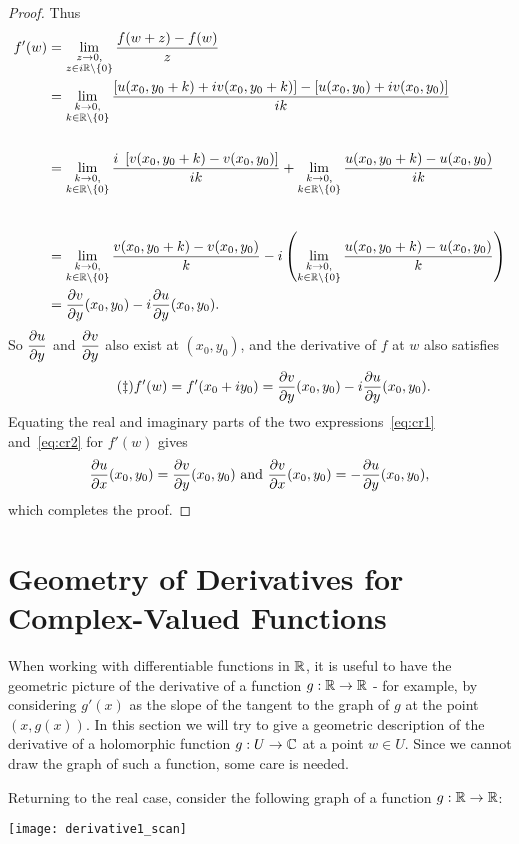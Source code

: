 \begin{proof}
Thus
\begin{align*}
f'(w) & = \rlim{z \to 0}{z \in i\R \backslash \set{0}} \frac{f(w+z)-f(w)}{z} \\
& = \rlim{k \to 0}{k \in \R \backslash \set{0}} \frac{\left[ u(x_0,y_0+k)+iv(x_0,y_0+k) \right] - \left[ u(x_0,y_0)+iv(x_0,y_0) \right]}{ik} \\
& \vspace*{2cm} \\
& =   \rlim{k \to 0}{k \in \R \backslash \set{0}} \frac{i\ \left[ v(x_0,y_0+k)-v(x_0,y_0) \right]}{ik} +
 \rlim{k \to 0}{k \in \R \backslash \set{0}} \frac{u(x_0,y_0+k)-u(x_0,y_0)}{ik}     \\[5ex]
 & =   \rlim{k \to 0}{k \in \R \backslash \set{0}} \frac{v(x_0,y_0+k)-v(x_0,y_0)}{k} 
 -i \left( \rlim{k \to 0}{k \in \R \backslash \set{0}} \frac{u(x_0,y_0+k)-u(x_0,y_0)}{k} \right)     \\
 & = \pd{v}{y} (x_0,y_0)-i \pd{u}{y} (x_0,y_0).
\end{align*}
So $\dfrac{\partial u}{\partial y}$ and $\dfrac{\partial v}{\partial y}$ also exist at $(x_0,y_0)$, and the derivative of $f$ at $w$ also satisfies
\begin{equation}
\label{eq:cr2}
\tag{$\ddagger$}
f'(w) = f'(x_0+iy_0) = \dfrac{\partial v}{\partial y} (x_0,y_0) - i \dfrac{\partial u}{\partial y} (x_0,y_0).
\end{equation}
Equating the real and imaginary parts of the two expressions~\eqref{eq:cr1} and~\eqref{eq:cr2} for $f'(w)$ gives
\[
\dfrac{\partial u}{\partial x} (x_0,y_0) = \dfrac{\partial v}{\partial y} (x_0,y_0) \text{ and } \dfrac{\partial v}{\partial x}(x_0,y_0) = - \dfrac{\partial u}{\partial y} (x_0,y_0),
\]
which completes the proof.
\end{proof}

\section{Geometry of Derivatives for Complex-Valued Functions}
When working with differentiable functions in $\mathbb{R}$, it is useful to have the geometric picture of the derivative of a function $g: \mathbb{R} \to \mathbb{R}$ - for example, by considering $g'(x)$ as the slope of the tangent to the graph of $g$ at the point $(x,g(x))$.  In this section we will try to give a geometric description of the derivative of a holomorphic function $g:U \to \mathbb{C}$ at a point $w \in U$.  Since we cannot draw the graph of such a function, some care is needed.

Returning to the real case, consider the following graph of a function $g:\mathbb{R} \to \mathbb{R}$:
\begin{center}
\texttt{[image: derivative1\_scan]}
\end{center}

